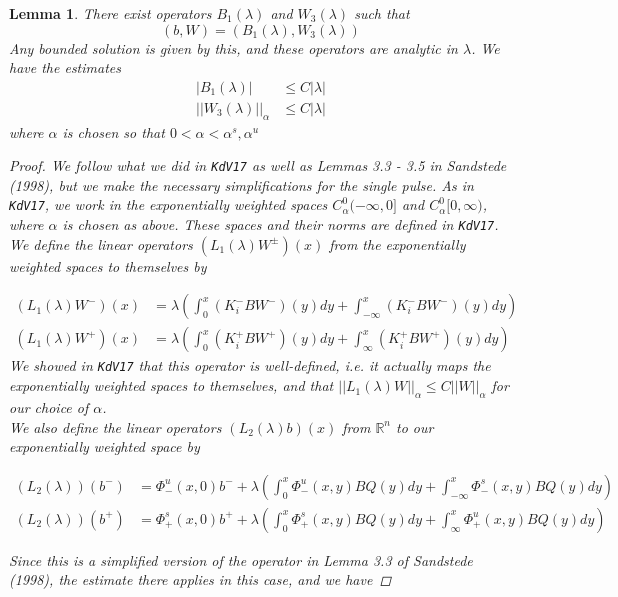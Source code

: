\documentclass[12pt]{article}
\def\R{{\mathbb R}}
\newtheorem{lemma}{Lemma}
\begin{document}
\begin{lemma}\label{inv1}
There exist operators $B_1(\lambda)$ and $W_3(\lambda)$ such that 
\[
(b, W) = (B_1(\lambda), W_3(\lambda))
\]
Any bounded solution is given by this, and these operators are analytic in $\lambda$. We have the estimates
\begin{align*}
|B_1(\lambda)| &\leq C|\lambda| \\
||W_3(\lambda)||_\alpha &\leq C|\lambda|
\end{align*}
where $\alpha$ is chosen so that $0 < \alpha < \alpha^s, \alpha^u$
\begin{proof}
We follow what we did in \texttt{KdV17} as well as Lemmas 3.3 - 3.5 in Sandstede (1998), but we make the necessary simplifications for the single pulse. As in \texttt{KdV17}, we work in the exponentially weighted spaces $C^0_\alpha(-\infty, 0]$ and $C^0_\alpha[0, \infty)$, where $\alpha$ is chosen as above. These spaces and their norms are defined in \texttt{KdV17}. We define the linear operators $(L_1(\lambda)W^\pm)(x)$ from the exponentially weighted spaces to themselves by

\begin{align*}
(L_1(\lambda)W^-)(x) &= \lambda \left( \int_0^x (K_i^- B W^-)(y) dy + \int_{-\infty}^x (K_i^-B W^-)(y) dy \right) \\
(L_1(\lambda)W^+)(x) &= \lambda \left( \int_0^x (K_i^+ B W^+)(y) dy + \int_{\infty}^x (K_i^+ B W^+)(y) dy \right)
\end{align*}
We showed in \texttt{KdV17} that this operator is well-defined, i.e. it actually maps the exponentially weighted spaces to themselves, and that $||L_1(\lambda)W||_\alpha \leq C||W||_\alpha$ for our choice of $\alpha$.\\

We also define the linear operators $(L_2(\lambda)b)(x)$ from $\R^n$ to our exponentially weighted space by

\begin{align*}
(L_2(\lambda))(b^-) &= \Phi^u_-(x, 0)b^- + \lambda \left( \int_0^x \Phi^u_-(x, y) B Q(y)dy + \int_{-\infty}^x \Phi^s_-(x, y)B Q(y) dy \right)\\
(L_2(\lambda))(b^+) &= \Phi^s_+(x, 0)b^+ + \lambda \left( \int_0^x \Phi^s_+(x, y) B Q(y) dy + \int_{\infty}^x \Phi^u_+(x, y) B Q(y) dy \right)
\end{align*}

Since this is a simplified version of the operator in Lemma 3.3 of Sandstede (1998), the estimate there applies in this case, and we have


\end{proof}
\end{lemma}
\end{document}

